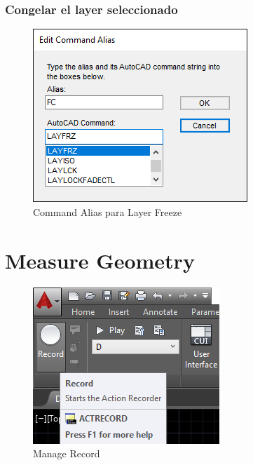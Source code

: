 \documentclass{report}
\begin{document}
\subsection{Congelar el layer seleccionado}

\begin{figure}[H]
	\centering
	\includegraphics[width=0.75\linewidth, height=0.45\textheight,keepaspectratio]{Imagenes/autocad_alias_layeroptions_04}
	\caption{Command Alias para Layer Freeze}
	\label{fig:autocadaliaslayeroptions04}
\end{figure}


\chapter{Measure Geometry}

\begin{figure}[H]
	\centering
	\includegraphics[width=0.55\linewidth, height=0.35\textheight,keepaspectratio]{Imagenes/autocad_measuregeom01}
	\caption{Manage \textrightarrow Record}
	\label{fig:autocadmeasuregeom01}
\end{figure}
\end{document}

